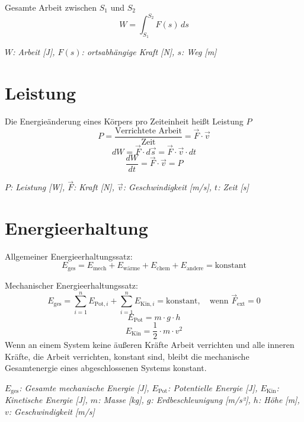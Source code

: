 \documentclass[a4paper,10pt]{article}
\newenvironment{displayformula}
{
	\begin{framed}
		\color{formulaColor}
	}
	{\end{framed}}
\newcommand{\formulalegend}[1]{%
	\par\vspace{0.5ex}%
	{{\color{legendColor}\RaggedRight\small\textit{#1}}}%
	\par\vspace{1.5ex}%
}
\begin{document}
\begin{displayformula}
	Gesamte Arbeit zwischen \( S_1 \) und \( S_2 \)
	\[
	W = \int_{S_1}^{S_2} F(s) \, ds
	\]
\end{displayformula}
\formulalegend{
	\( W \): Arbeit [J], \( F(s) \): ortsabhängige Kraft [N], \( s \): Weg [m]
}


\section{Leistung}

\begin{displayformula}
	Die Energieänderung eines Körpers pro Zeiteinheit heißt Leistung \( P \)
	\[
	P = \frac{\text{Verrichtete Arbeit}}{\text{Zeit}} = \vec{F} \cdot \vec{v}
	\]
	\[
	dW = \vec{F} \cdot d \vec{s} = \vec{F} \cdot \vec{v} \cdot dt
	\]
	\[
	\frac{dW}{dt} = \vec{F} \cdot \vec{v} = P
	\]
\end{displayformula}
\formulalegend{
	\( P \): Leistung [W], \( \vec{F} \): Kraft [N], \( \vec{v} \): Geschwindigkeit [m/s], \( t \): Zeit [s]
}

\section{Energieerhaltung}

\begin{displayformula}
	Allgemeiner Energieerhaltungssatz: 
	\[
	E_{\text{ges}} = E_{\text{mech}} + E_{\text{wärme}} + E_{\text{chem}} + E_{\text{andere}} = \text{konstant}
	\]
\end{displayformula}

\begin{displayformula}
	Mechanischer Energieerhaltungssatz:
	\[
	E_{\text{ges}} = \sum_{i=1}^{n} E_{\text{Pot}, i} + \sum_{i=1}^{n} E_{\text{Kin}, i} = \text{konstant}, \quad \text{wenn } \vec{F}_{\text{ext}} = 0
	\]
	\[
	E_{\text{Pot}} = m \cdot g \cdot h
	\]
	\[
	E_{\text{Kin}} = \frac{1}{2} \cdot m \cdot v^2
	\]
	Wenn an einem System keine äußeren Kräfte Arbeit verrichten und alle inneren Kräfte, die Arbeit verrichten, konstant sind, bleibt die mechanische Gesamtenergie eines abgeschlossenen Systems konstant.
\end{displayformula}
\formulalegend{
	\( E_{\text{ges}} \): Gesamte mechanische Energie [J], \( E_{\text{Pot}} \): Potentielle Energie [J], \( E_{\text{Kin}} \): Kinetische Energie [J], \( m \): Masse [kg], \( g \): Erdbeschleunigung [m/s²], \( h \): Höhe [m], \( v \): Geschwindigkeit [m/s]
}
\end{document}

